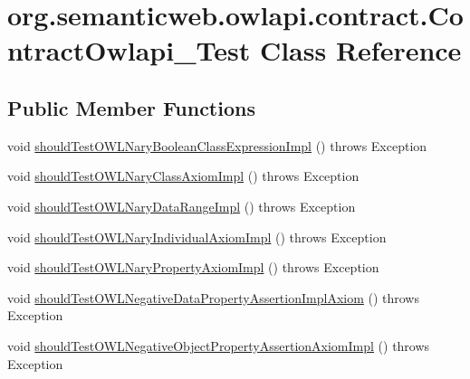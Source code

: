 \hypertarget{classorg_1_1semanticweb_1_1owlapi_1_1contract_1_1_contract_owlapi__3_test}{\section{org.\-semanticweb.\-owlapi.\-contract.\-Contract\-Owlapi\-\_\-Test Class Reference}
\label{classorg_1_1semanticweb_1_1owlapi_1_1contract_1_1_contract_owlapi__3_test}
}
\subsection*{Public Member Functions}
\begin{DoxyCompactItemize}
\item 
void \hyperlink{classorg_1_1semanticweb_1_1owlapi_1_1contract_1_1_contract_owlapi__3_test_a649e2571674794e52bc6b375290a34c1}{should\-Test\-O\-W\-L\-Nary\-Boolean\-Class\-Expression\-Impl} ()  throws Exception 
\item 
void \hyperlink{classorg_1_1semanticweb_1_1owlapi_1_1contract_1_1_contract_owlapi__3_test_afd940fe75d324744bbc6974876571465}{should\-Test\-O\-W\-L\-Nary\-Class\-Axiom\-Impl} ()  throws Exception 
\item 
void \hyperlink{classorg_1_1semanticweb_1_1owlapi_1_1contract_1_1_contract_owlapi__3_test_a89c955f80566160893c9d93d4216518b}{should\-Test\-O\-W\-L\-Nary\-Data\-Range\-Impl} ()  throws Exception 
\item 
void \hyperlink{classorg_1_1semanticweb_1_1owlapi_1_1contract_1_1_contract_owlapi__3_test_ad792fdb846aa14cff56dcf30e960e33a}{should\-Test\-O\-W\-L\-Nary\-Individual\-Axiom\-Impl} ()  throws Exception 
\item 
void \hyperlink{classorg_1_1semanticweb_1_1owlapi_1_1contract_1_1_contract_owlapi__3_test_a21dfb6dcf85d6f9db7262717f133e1a4}{should\-Test\-O\-W\-L\-Nary\-Property\-Axiom\-Impl} ()  throws Exception 
\item 
void \hyperlink{classorg_1_1semanticweb_1_1owlapi_1_1contract_1_1_contract_owlapi__3_test_abe8a081ca3e96b5222e0e4d6346df52a}{should\-Test\-O\-W\-L\-Negative\-Data\-Property\-Assertion\-Impl\-Axiom} ()  throws Exception 
\item 
void \hyperlink{classorg_1_1semanticweb_1_1owlapi_1_1contract_1_1_contract_owlapi__3_test_a1f4fb5a0b132e955688e3b31b4dd1824}{should\-Test\-O\-W\-L\-Negative\-Object\-Property\-Assertion\-Axiom\-Impl} ()  throws Exception 

\end{DoxyCompactItemize}
